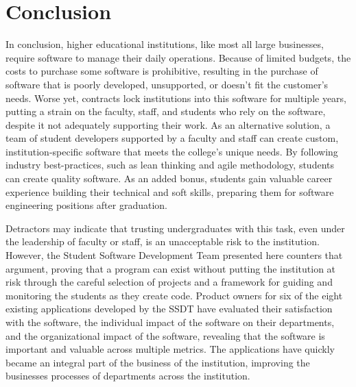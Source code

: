 \section{Conclusion}
In conclusion, higher educational institutions, like most all large businesses, require software to manage their daily operations. Because of limited budgets, the costs to purchase some software is prohibitive, resulting in the purchase of software that is poorly developed, unsupported, or doesn't fit the customer's needs. Worse yet, contracts lock institutions into this software for multiple years, putting a strain on the faculty, staff, and students who rely on the software, despite it not adequately supporting their work. As an alternative solution, a team of student developers supported by a faculty and staff can create custom, institution-specific software that meets the college's unique needs. By following industry best-practices, such as lean thinking and agile methodology, students can create quality software. As an added bonus, students gain valuable career experience building their technical and soft skills, preparing them for software engineering positions after graduation. 

Detractors may indicate that trusting undergraduates with this task, even under the leadership of faculty or staff, is an unacceptable risk to the institution. However, the Student Software Development Team presented here counters that argument, proving that a program can exist without putting the institution at risk through the careful selection of projects and a framework for guiding and monitoring the students as they create code. Product owners for six of the eight existing applications developed by the SSDT have evaluated their satisfaction with the software, the individual impact of the software on their departments, and the organizational impact of the software, revealing that the software is important and valuable across multiple metrics. The applications have quickly became an integral part of the business of the institution, improving the businesses processes of departments across the institution.